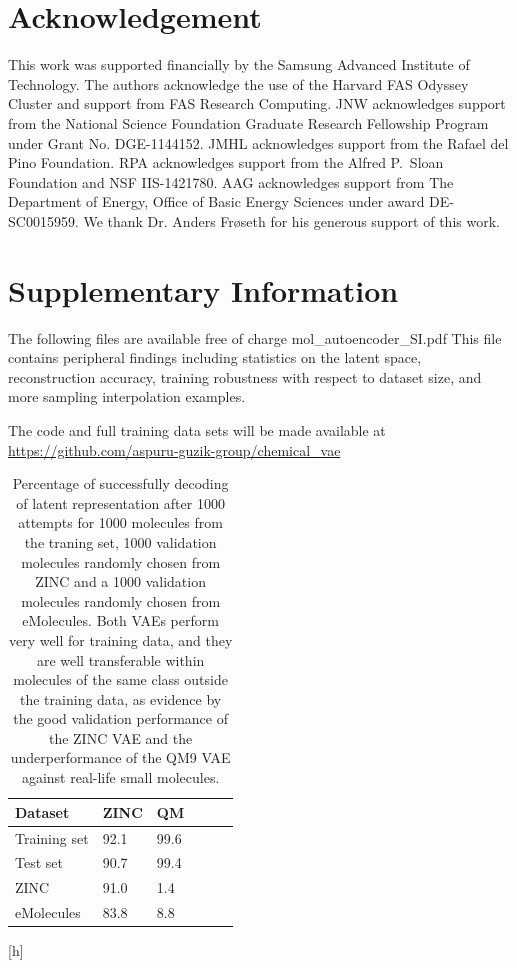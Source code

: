 \section{Acknowledgement}

This work was supported financially by the Samsung Advanced Institute of Technology.
The authors acknowledge the use of the Harvard FAS Odyssey Cluster and support from FAS Research Computing.
JNW acknowledges support from the National Science Foundation Graduate Research Fellowship Program under Grant No. DGE-1144152.
JMHL acknowledges support from the Rafael del Pino Foundation. RPA acknowledges support from the Alfred P.\ Sloan Foundation and NSF IIS-1421780. AAG acknowledges support from The Department of Energy, Office of Basic Energy Sciences under award DE-SC0015959.
We thank Dr. Anders Fr\o seth for his generous support of this work.


\section{Supplementary Information}
The following files are available free of charge  mol\_autoencoder\_SI.pdf
This file contains peripheral findings including statistics on the latent space, reconstruction accuracy, training robustness with respect to dataset size, and more sampling interpolation examples.

The code and full training data sets will be made available at \url{https://github.com/aspuru-guzik-group/chemical_vae}


\begin{table}[h]
\centering
\caption{Percentage of successfully decoding of latent representation after 1000 attempts for 1000 molecules from the traning set, 1000 validation molecules randomly chosen from ZINC and a 1000 validation molecules randomly chosen from eMolecules. Both VAEs perform very well for training data, and they are well transferable within molecules of the same class outside the training data, as evidence by the good validation performance of the ZINC VAE and the underperformance of the QM9 VAE against real-life small molecules.}
\begin{tabular}{lp{1cm}lp{1cm}lp{1cm}}
\hline
Dataset & ZINC & QM \\
\hline
Training set & 92.1 & 99.6 \\
Test set & 90.7 & 99.4 \\
ZINC & 91.0 & 1.4 \\
eMolecules & 83.8 & 8.8 \\
\hline
\end{tabular}
\label{tab:recovery statistics}
\end{table}[h]

